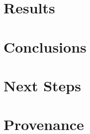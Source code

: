 \documentclass[11pt,a4paper]{article}
\begin{document}
\section{Results}

%
%

\section{Conclusions}


\section{Next Steps}


\section{Provenance}
\end{document}
